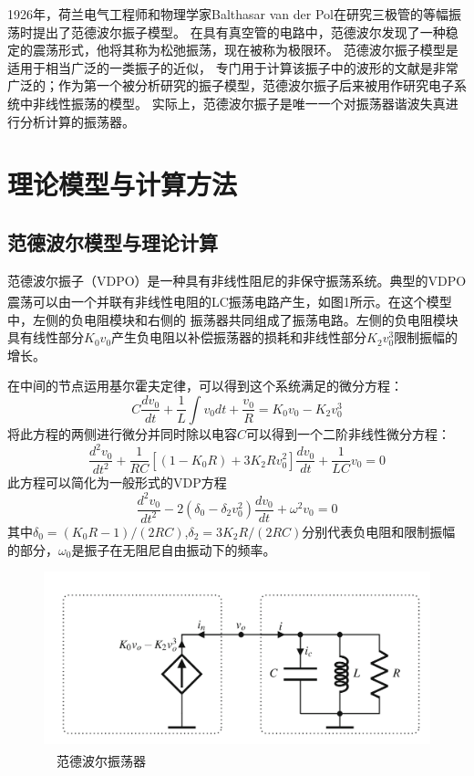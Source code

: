 \documentclass[10.5pt,oneside,a4paper]{article}
\theoremstyle{mystyle}
\begin{document}
1926年，荷兰电气工程师和物理学家Balthasar van der Pol在研究三极管的等幅振荡时提出了范德波尔振子模型。
在具有真空管的电路中，范德波尔发现了一种稳定的震荡形式，他将其称为松弛振荡，现在被称为极限环。
范德波尔振子模型是适用于相当广泛的一类振子的近似，
专门用于计算该振子中的波形的文献是非常广泛的；作为第一个被分析研究的振子模型，范德波尔振子后来被用作研究电子系统中非线性振荡的模型。
实际上，范德波尔振子是唯一一个对振荡器谐波失真进行分析计算的振荡器。

\section{理论模型与计算方法}

\subsection{范德波尔模型与理论计算}

范德波尔振子（VDPO）是一种具有非线性阻尼的非保守振荡系统。典型的VDPO震荡可以由一个并联有非线性电阻的LC振荡电路产生，如图1所示\textsuperscript{\cite{Casaleiro2019}}。在这个模型中，左侧的负电阻模块和右侧的
振荡器共同组成了振荡电路。左侧的负电阻模块具有线性部分$K_0v_0$产生负电阻以补偿振荡器的损耗和非线性部分$K_2v_0^3$限制振幅的增长。

在中间的节点运用基尔霍夫定律，可以得到这个系统满足的微分方程：
\begin{equation}
    C\frac{dv_0}{dt}+\frac{1}{L}\int v_0dt+\frac{v_0}{R}=K_0v_0-K_2v_0^3
\end{equation}
将此方程的两侧进行微分并同时除以电容$C$可以得到一个二阶非线性微分方程：
\begin{equation}
    \frac{d^2 v_0}{dt^2}+\frac{1}{RC}[(1-K_0R)+3K_2Rv_0^2]\frac{dv_0}{dt}+\frac{1}{LC}v_0=0
\end{equation}
此方程可以简化为一般形式的VDP方程
\begin{equation}
    \frac{d^2 v_0}{dt^2}-2(\delta_0-\delta_2v_0^2)\frac{dv_0}{dt}+\omega^2v_0=0
\end{equation}
其中$\delta_0=(K_0R-1)/(2RC)$,$\delta_2=3K_2R/(2RC)$分别代表负电阻和限制振幅的部分，$\omega_0$是振子在无阻尼自由振动下的频率。

\begin{figure}[h]
    \centering
    \includegraphics[width=0.8\linewidth]{VDPO.png}
    \caption{$\quad$范德波尔振荡器\textsuperscript{\cite{Casaleiro2019}}}
\end{figure}
\end{document}
